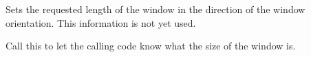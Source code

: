 \label{wxquerylayoutinfoeventsetrequestedlength}


Sets the requested length of the window in the direction of the window orientation. This information
is not yet used.

\label{wxquerylayoutinfoeventsetsize}


Call this to let the calling code know what the size of the window is.

